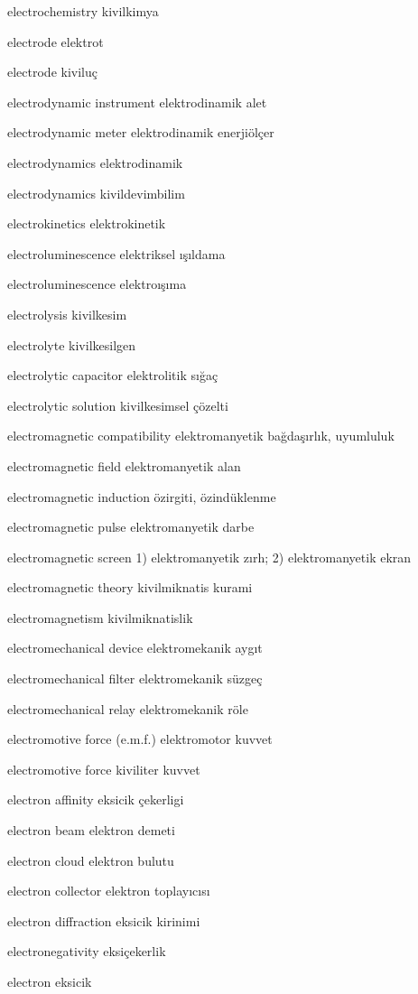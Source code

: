 \documentclass[12pt,fleqn]{article}\usepackage{../../common}
\begin{document}
electrochemistry kivilkimya

electrode elektrot

electrode kiviluç

electrodynamic instrument elektrodinamik alet

electrodynamic meter elektrodinamik enerjiölçer

electrodynamics elektrodinamik

electrodynamics kivildevimbilim

electrokinetics elektrokinetik

electroluminescence elektriksel ışıldama

electroluminescence elektroışıma

electrolysis kivilkesim

electrolyte kivilkesilgen

electrolytic capacitor elektrolitik sığaç

electrolytic solution kivilkesimsel çözelti

electromagnetic compatibility elektromanyetik bağdaşırlık, uyumluluk

electromagnetic field elektromanyetik alan

electromagnetic induction özirgiti, özindüklenme

electromagnetic pulse elektromanyetik darbe

electromagnetic screen 1) elektromanyetik zırh; 2) elektromanyetik ekran

electromagnetic theory kivilmiknatis kurami

electromagnetism kivilmiknatislik

electromechanical device elektromekanik aygıt

electromechanical filter elektromekanik süzgeç

electromechanical relay elektromekanik röle

electromotive force (e.m.f.) elektromotor kuvvet

electromotive force kiviliter kuvvet

electron affinity eksicik çekerligi

electron beam elektron demeti

electron cloud elektron bulutu

electron collector elektron toplayıcısı

electron diffraction eksicik kirinimi

electronegativity eksiçekerlik

electron eksicik
\end{document}

